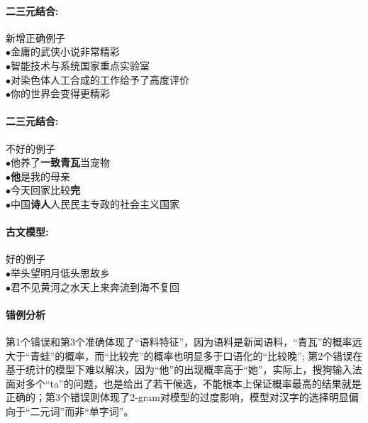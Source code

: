 \documentclass[UTF8, onecolumn, a4paper]{article}
\begin{document}
\paragraph{二三元结合:}新增正确例子\\
$\bullet$金庸的武侠小说非常精彩\\
$\bullet$智能技术与系统国家重点实验室\\
$\bullet$对染色体人工合成的工作给予了高度评价\\
$\bullet$你的世界会变得更精彩
\paragraph{二三元结合:}不好的例子\\
$\bullet$他养了\textbf{一致青瓦}当宠物\\
$\bullet$\textbf{他}是我的母亲\\
$\bullet$今天回家比较\textbf{完}\\
$\bullet$中国\textbf{诗人}人民民主专政的社会主义国家
\paragraph{古文模型:} 好的例子\\
$\bullet$举头望明月低头思故乡\\
$\bullet$君不见黄河之水天上来奔流到海不复回
\paragraph{错例分析}
第1个错误和第3个准确体现了“语料特征”，因为语料是新闻语料，“青瓦”的概率远大于“青蛙”的概率，而“比较完”的概率也明显多于口语化的“比较晚”; 第2个错误在基于统计的模型下难以解决，因为“他”的出现概率高于“她”，实际上，搜狗输入法面对多个“ta”的问题，也是给出了若干候选，不能根本上保证概率最高的结果就是正确的；第3个错误则体现了2-gram对模型的过度影响，模型对汉字的选择明显偏向于“二元词”而非“单字词”。
\end{document}
